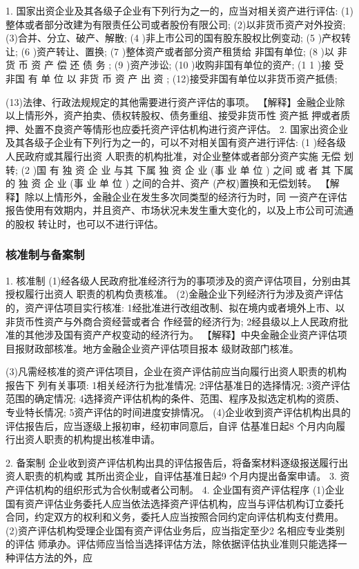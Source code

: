 \documentclass[UTF8,12pt]{ctexart}
\numberwithin{equation}{section} %
\numberwithin{figure}{section}
\numberwithin{table}{section}
\begin{document}
	1. 国家出资企业及其各级子企业有下列行为之一的，应当对相关资产进行评估:
	(1)整体或者部分改建为有限责任公司或者股份有限公司;
	(2)以非货币资产对外投资;
	(3)合并、分立、破产、解散;
	(4 )非上市公司的国有股东股权比例变动;
	(5 )产权转让;
	(6 )资产转让、置换;
	(7 )整体资产或者部分资产租赁给 非国有单位;
	(8 )以 非货 币 资 产 偿 还 债 务 ;
	(9 )资产涉讼;
	(10 )收购非国有单位的资产;
	(1 1 )接 受 非国 有 单 位 以 非货 币 资 产 出 资 ;
	(12)接受非国有单位以非货币资产抵债;
	
	(13)法律、行政法规规定的其他需要进行资产评估的事项。
	【解释】金融企业除以上情形外，资产拍卖、债权转股权、债务重组、接受非货币性
	资产抵 押或者质押、处置不良资产等情形也应委托资产评估机构进行资产评估。
	2. 国家出资企业及其各级子企业有下列行为之一的，可以不对相关国有资产进行评估:
	(1 )经各级人民政府或其履行出资 人职责的机构批准，对企业整体或者部分资产实施 无偿
	划转;
	(2 )国 有 独 资 企 业 与其 下属 独 资 企 业 (事 业 单 位 ) 之间 或 者 其 下属 的 独 资 企 业 (事 业 单 位 )
	之间的合并、资产 (产权)置换和无偿划转。
	【解释】除以上情形外，金融企业在发生多次同类型的经济行为时，同 一资产在评估
	报告使用有效期内，并且资产、市场状况未发生重大变化的，以及上市公司可流通的股权
	转让时，也可以不进行评估。
	
	\subsubsection{核准制与备案制}
	1. 核准制
	(1)经各级人民政府批准经济行为的事项涉及的资产评估项目，分别由其授权履行出资人
	职责的机构负责核准。
	(2)金融企业下列经济行为涉及资产评估的，资产评估项目实行核准:
	1经批准进行改组改制、拟在境内或者境外上市、以非货币性资产与外商合资经营或者合
	作经营的经济行为;
	2经县级以上人民政府批准的其他涉及国有资产产权变动的经济行为。
	【解释】中央金融企业资产评估项目报财政部核准。地方金融企业资产评估项目报本
	级财政部门核准。
	
	(3)凡需经核准的资产评估项目，企业在资产评估前应当向履行出资人职责的机构报告下
	列有关事项:
	1相关经济行为批准情况;
	2评估基准日的选择情况;
	3资产评估范围的确定情况;
	4选择资产评估机构的条件、范围、程序及拟选定机构的资质、 专业特长情况;
	5资产评估的时间进度安排情况。
	(4)企业收到资产评估机构出具的评估报告后，应当逐级上报初审，经初审同意后，自评
	估基准日起8 个月内向履行出资人职责的机构提出核准申请。
	
	2. 备案制
	企业收到资产评估机构出具的评估报告后，将备案材料逐级报送履行出资人职责的机构或
	其所出资企业，自评估基准日起9 个月内提出备案申请。
	3. 资产评估机构的组织形式为合伙制或者公司制。
	4. 企业国有资产评估程序
	(1)企业国有资产评估业务委托人应当依法选择资产评估机构，应当与评估机构订立委托
	合同，约定双方的权利和义务，委托人应当按照合同约定向评估机构支付费用。
	(2)资产评估机构受理企业国有资产评估业务后，应当指定至少2 名相应专业类别的评估
	师承办。评估师应当恰当选择评估方法，除依据评估执业准则只能选择一种评估方法的外，应
	
\end{document}
